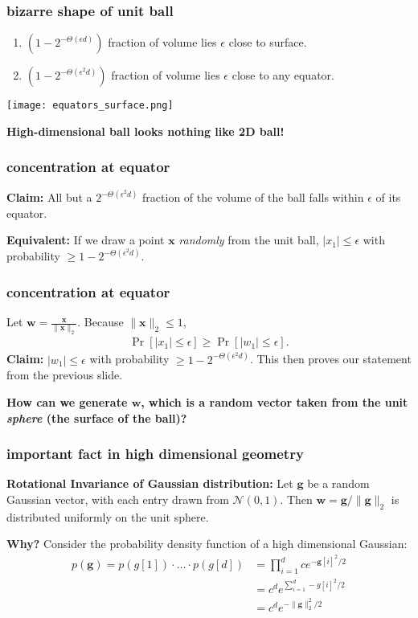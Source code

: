 \documentclass[compress]{beamer}
\newcommand{\bv}[1]{\mathbf{#1}}
\begin{document}
\begin{frame}[t]
	\frametitle{bizarre shape of unit ball}
	\begin{enumerate}
		\item $(1 -2^{-\Theta(\epsilon d)})$ fraction of volume lies $\epsilon$ close to surface. 
		\item $(1 -  2^{-\Theta(\epsilon^2 d)})$ fraction of volume lies $\epsilon$ close to any equator. 
	\end{enumerate}

	\begin{center}
	\texttt{[image: equators\_surface.png]}
	
	\textbf{\alert{High-dimensional ball looks nothing like 2D ball!}}
	\end{center}
\end{frame}

\begin{frame}[t]
	\frametitle{concentration at equator}
	\textbf{Claim:} All but a $2^{-\Theta(\epsilon^2 d)}$ fraction of the volume of the ball falls within $\epsilon$ of its equator. 
		
	\textbf{Equivalent:} If we draw a point $\bv{x}$ \emph{randomly} from the unit ball, $|x_1| \leq \epsilon$ with probability $\geq 1 - {2}^{-\Theta(\epsilon^2 d)}$. 
\end{frame}

\begin{frame}[t]
	\frametitle{concentration at equator}
	Let $\bv{w} = \frac{\bv{x}}{\|\bv{x}\|_2}$. Because $\|\bv{x}\|_2 \leq 1$,
\begin{align*}
\Pr\left[|x_1| \leq \epsilon\right] \geq \Pr\left[|w_1| \leq \epsilon\right].
\end{align*}
	\textbf{Claim:} $|w_1| \leq \epsilon$ with probability $\geq 1 - 2^{-\Theta(\epsilon^2 d)}$. This then proves our statement from the previous slide.
	\vspace{8em}

\alert{\textbf{How can we generate $\bv{w}$, which is a random vector taken from the unit \emph{sphere} (the surface of the ball)?}}
\end{frame}

\begin{frame}[t]
	\frametitle{important fact in high dimensional geometry}
	\textbf{Rotational Invariance of Gaussian distribution:}
	Let $\textbf{g}$ be a random Gaussian vector, with each entry drawn from $\mathcal{N}(0,1)$. Then $\bv{w} = \bv{g}/\|\bv{g}\|_2$ is distributed uniformly on the unit sphere. 
	
	\textbf{Why?} Consider the probability density function of a high dimensional Gaussian:
	\begin{align*}
		p(\bv{g}) = p({g}[1])\cdot \ldots \cdot p({g}[d]) &= \prod_{i=1}^d ce^{-\bv{g}[i]^2/2}\\ &= c^d e^{\sum_{i=1}^d -{g}[i]^2/2} \\
		&= c^d e^{-\|\bv{g}\|_2^2/2}
	\end{align*}
	
\end{frame}
\end{document}
